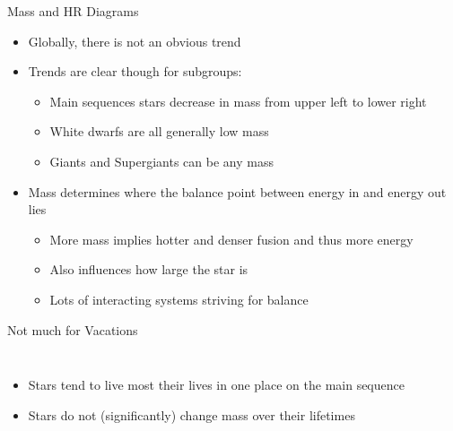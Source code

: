 \documentclass[pdf,aspectratio=169]{beamer}
\begin{document}
\begin{frame}{Mass and HR Diagrams}
  \begin{itemize}
	\item Globally, there is not an obvious trend
	\item Trends are clear though for subgroups:
	  \begin{itemize}
		\item Main sequences stars decrease in mass from upper left to lower right
		\item White dwarfs are all generally low mass
		\item Giants and Supergiants can be any mass
	  \end{itemize}
	\item Mass determines where the balance point between energy in and energy out lies
	  \begin{itemize}
		\item More mass implies hotter and denser fusion and thus more energy
		\item Also influences how large the star is
		\item Lots of interacting systems striving for balance
	  \end{itemize}
  \end{itemize}
\end{frame}

\begin{frame}{Not much for Vacations}
  \begin{columns}
	\begin{itemize}
	  \item Stars tend to live most their lives in one place on the main sequence
	  \item Stars do not (significantly) change mass over their lifetimes
	\end{itemize}
	\begin{center}
	\end{center}
  \end{columns}
\end{frame}
\end{document}
